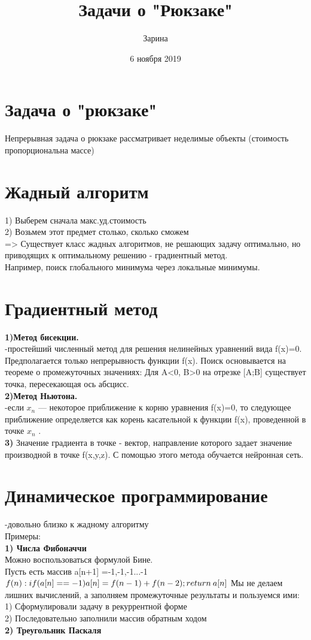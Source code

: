 \documentclass[a4paper,12pt]{article}
\author{Зарина}
\title{Задачи о "Рюкзаке"}
\date{6 ноября 2019}
\begin{document}
\section {Задача о "рюкзаке"}
Непрерывная задача о рюкзаке рассматривает неделимые объекты (стоимость пропорциональна массе)

\section{Жадный алгоритм}
1) Выберем сначала макс.уд.стоимость\\
2) Возьмем этот предмет столько, сколько сможем\\
=> Существует класс жадных алгоритмов, не решающих задачу оптимально, но приводящих к оптимальному решению - градиентный метод.\\
Например, поиск глобального минимума через локальные минимумы.
\section {Градиентный метод}
\textbf{1)Метод бисекции.}\\
-простейший численный метод для решения нелинейных уравнений вида f(x)=0. Предполагается только непрерывность функции f(x). Поиск основывается на теореме о промежуточных значениях:
Для A<0, B>0 на отрезке [A;B] существует точка, пересекающая ось абсцисс.\\
\textbf{2)Метод Ньютона.}\\
-если $x_{n}$ — некоторое приближение к корню  уравнения f(x)=0, то следующее приближение определяется как корень касательной к функции f(x), проведенной в точке $x_{n}$ .\\
\textbf{3)} Значение градиента в точке - вектор, направление которого задает значение производной в точке f(x,y,z).
С помощью этого метода обучается нейронная сеть.\\
\section{Динамическое программирование}
-довольно близко к жадному алгоритму\\
Примеры:\\
\textbf{1) Числа Фибоначчи}\\
Можно воспользоваться формулой Бине.\\
Пусть есть массив a[n+1] ={-1,-1,-1...-1}\\
$f(n):\\
if (a[n]==-1)\\
a[n]=f(n-1)+f(n-2);\\
return\:a[n]\\$
Мы не делаем лишних вычислений, а заполняем промежуточные результаты и пользуемся ими:\\
1) Сформулировали задачу в рекуррентной форме\\
2) Последовательно заполнили массив обратным ходом\\
\textbf{2) Треугольник Паскаля}\\
\end{document}
